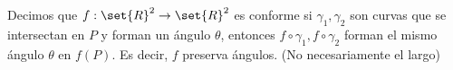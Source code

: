 \documentclass{notetaking}
\begin{document}
\begin{defn}
    Decimos que \(f:\set{R}^2\rightarrow\set{R}^2\) es conforme si \(\gamma_1,\gamma_2\) son curvas que se intersectan en \(P\) y forman un ángulo \(\theta\), entonces \(f\circ\gamma_1,f\circ\gamma_2\) forman el mismo ángulo \(\theta\) en \(f(P)\). Es decir, \(f\) preserva ángulos. (No necesariamente el largo)
\end{defn}
\end{document}
